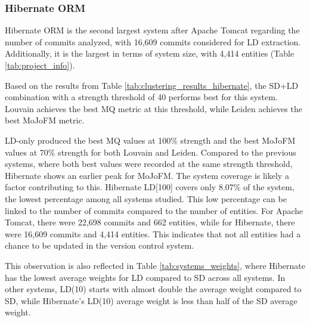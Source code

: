 \documentclass[12pt, a4paper, twoside]{report}
\begin{document}
\subsubsection{Hibernate ORM}

Hibernate ORM is the second largest system after Apache Tomcat regarding the number of commits analyzed, with 16,609 commits considered for LD extraction. Additionally, it is the largest in terms of system size, with 4,414 entities (Table \ref{tab:project_info}).

Based on the results from Table \ref{tab:clustering_results_hibernate}, the SD+LD combination with a strength threshold of 40 performs best for this system. Louvain achieves the best MQ metric at this threshold, while Leiden achieves the best MoJoFM metric.

LD-only produced the best MQ values at 100\% strength and the best MoJoFM values at 70\% strength for both Louvain and Leiden. Compared to the previous systems, where both best values were recorded at the same strength threshold, Hibernate shows an earlier peak for MoJoFM. The system coverage is likely a factor contributing to this. Hibernate  LD[100] covers only 8.07\% of the system, the lowest percentage among all systems studied. This low percentage can be linked to the number of commits compared to the number of entities. For Apache Tomcat, there were 22,698 commits and 662 entities, while for Hibernate, there were 16,609 commits and 4,414 entities. This indicates that not all entities had a chance to be updated in the version control system.

This observation is also reflected in Table \ref{tab:systems_weights}, where Hibernate has the lowest average weights for LD compared to SD across all systems. In other systems, LD(10) starts with almost double the average weight compared to SD, while Hibernate's LD(10) average weight is less than half of the SD average weight.
\end{document}
